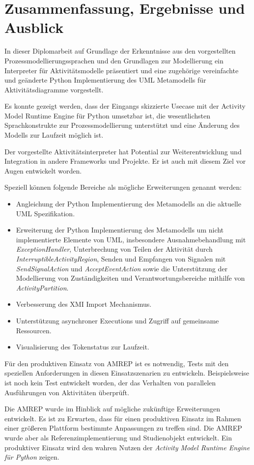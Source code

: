 \chapter{Zusammenfassung, Ergebnisse und Ausblick}\label{amrep-future}

In dieser Diplomarbeit auf Grundlage der Erkenntnisse aus den vorgestellten Prozessmodellierungssprachen und den Grundlagen zur Modellierung ein Interpreter für Aktivitätsmodelle präsentiert und eine zugehörige vereinfachte und geänderte Python Implementierung des UML Metamodells für Aktivitätsdiagramme vorgestellt.

Es konnte gezeigt werden, dass der Eingangs skizzierte Usecase mit der Activity Model Runtime Engine für Python umsetzbar ist, die wesentlichsten Sprachkonstrukte zur Prozessmodellierung unterstützt und eine Änderung des Modells zur Laufzeit möglich ist.

Der vorgestellte Aktivitätsinterpreter hat Potential zur Weiterentwicklung und Integration in andere Frameworks und Projekte. Er ist auch mit diesem Ziel vor Augen entwickelt worden.

Speziell können folgende Bereiche als mögliche Erweiterungen genannt werden:

\begin{itemize}
\item Angleichung der Python Implementierung des Metamodells an die aktuelle UML Spezifikation.
\item Erweiterung der Python Implementierung des Metamodells um nicht implementierte Elemente von UML, insbesondere Ausnahmebehandlung mit \emph{ExceptionHandler}, Unterbrechung von Teilen der Aktivität durch \emph{InterruptibleActivityRegion}, Senden und Empfangen von Signalen mit \emph{SendSignalAction} und \emph{AcceptEventAction} sowie die Unterstützung der Modellierung von Zuständigkeiten und Verantwortungsbereiche mithilfe von \emph{ActivityPartition}.
\item Verbesserung des XMI Import Mechanismus.
\item Unterstützung asynchroner Executions und Zugriff auf gemeinsame Ressourcen.
\item Visualisierung des Tokenstatus zur Laufzeit.
\end{itemize}

Für den produktiven Einsatz von AMREP ist es notwendig, Tests mit den speziellen Anforderungen in diesen Einsatzszenarien zu entwickeln. Beispielsweise ist noch kein Test entwickelt worden, der das Verhalten von parallelen Ausführungen von Aktivitäten überprüft.

Die AMREP wurde im Hinblick auf mögliche zukünftige Erweiterungen entwickelt. Es ist zu Erwarten, dass für einen produktiven Einsatz im Rahmen einer größeren Plattform bestimmte Anpassungen zu treffen sind. Die AMREP wurde aber als Referenzimplementierung und Studienobjekt entwickelt. Ein produktiver Einsatz wird den wahren Nutzen der \emph{Activity Model Runtime Engine für Python} zeigen.


